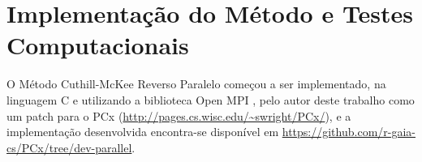 \section{Implementação do Método e Testes Computacionais}
O Método Cuthill-McKee Reverso Paralelo começou a ser implementado, na
linguagem C e utilizando a biblioteca Open MPI \cite{open_mpi}, pelo autor
deste trabalho como um patch para o PCx
(\url{http://pages.cs.wisc.edu/~swright/PCx/}), e a implementação desenvolvida
encontra-se disponível em
\url{https://github.com/r-gaia-cs/PCx/tree/dev-parallel}.
